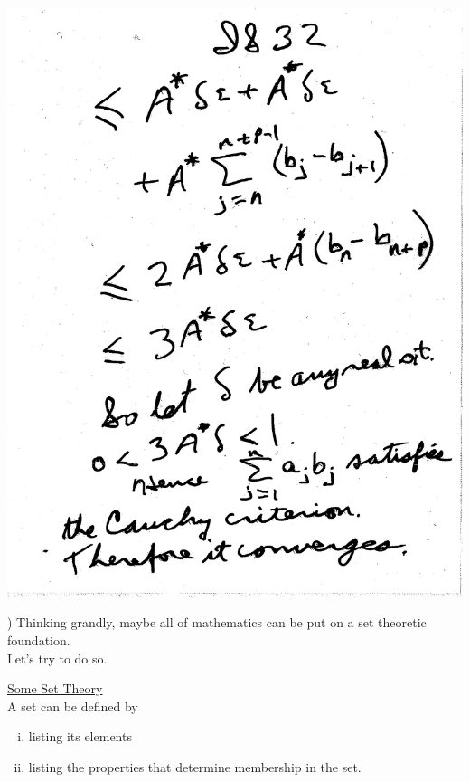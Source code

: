\documentclass[10pt,a4paper]{article}
\begin{document}
{{\includegraphics[scale=.5]{Pages/IS_32}

\newpage

) Thinking grandly, maybe all of mathematics can be put on a set theoretic foundation.\\ \indent Let's try to do so. 
\\ \vspace{2mm}
\hrulefill

\noindent \underline{Some Set Theory}
\vspace{2mm}
\\ \noindent A set can be defined by 
\begin{enumerate} [(i)]
\item listing its elements
\item listing the properties that determine membership in the set.
\end{enumerate}

}}
\end{document}
